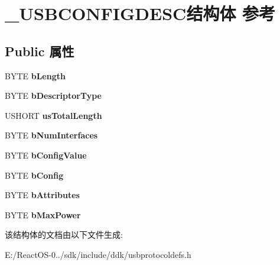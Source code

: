 \hypertarget{struct___u_s_b_c_o_n_f_i_g_d_e_s_c}{}\section{\+\_\+\+U\+S\+B\+C\+O\+N\+F\+I\+G\+D\+E\+S\+C结构体 参考}
\label{struct___u_s_b_c_o_n_f_i_g_d_e_s_c}
\subsection*{Public 属性}
\begin{DoxyCompactItemize}
\item 
\mbox{\label{struct___u_s_b_c_o_n_f_i_g_d_e_s_c_a24f3ba1a15e1decd32f4b8b959915f51}} 
B\+Y\+TE {\bfseries b\+Length}
\item 
\mbox{\label{struct___u_s_b_c_o_n_f_i_g_d_e_s_c_afaf32866e698a463176d30c502a91461}} 
B\+Y\+TE {\bfseries b\+Descriptor\+Type}
\item 
\mbox{\label{struct___u_s_b_c_o_n_f_i_g_d_e_s_c_aaf989b100190b734a37e35d964005e33}} 
U\+S\+H\+O\+RT {\bfseries us\+Total\+Length}
\item 
\mbox{\label{struct___u_s_b_c_o_n_f_i_g_d_e_s_c_a4cf135a0fb1551d5d9ca0ba7e82d6914}} 
B\+Y\+TE {\bfseries b\+Num\+Interfaces}
\item 
\mbox{\label{struct___u_s_b_c_o_n_f_i_g_d_e_s_c_a23d484820cbb8c525ce3744f0eb9ff0a}} 
B\+Y\+TE {\bfseries b\+Config\+Value}
\item 
\mbox{\label{struct___u_s_b_c_o_n_f_i_g_d_e_s_c_a1641daa53f5b68d2bf2881c1a8867d4b}} 
B\+Y\+TE {\bfseries b\+Config}
\item 
\mbox{\label{struct___u_s_b_c_o_n_f_i_g_d_e_s_c_abaeff05da4273359486c64707edec4ef}} 
B\+Y\+TE {\bfseries b\+Attributes}
\item 
\mbox{\label{struct___u_s_b_c_o_n_f_i_g_d_e_s_c_a5dfce1d8f6b5b4f0beb2dd0077c9243e}} 
B\+Y\+TE {\bfseries b\+Max\+Power}
\end{DoxyCompactItemize}


该结构体的文档由以下文件生成\+:\begin{DoxyCompactItemize}
\item 
E\+:/\+React\+O\+S-\/0../sdk/include/ddk/usbprotocoldefs.\+h\end{DoxyCompactItemize}
